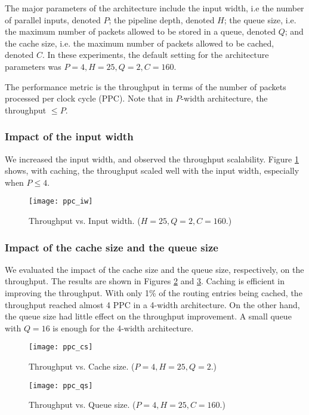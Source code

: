 \documentclass{sigcomm-alternate}
\begin{document}
The major parameters of the architecture include the input width, i.e the number of parallel inputs, denoted $P$; the pipeline depth, denoted $H$; the queue size, i.e. the maximum number of packets allowed to be stored in a queue, denoted $Q$; and the cache size, i.e. the maximum number of packets allowed to be cached, denoted $C$. In these experiments, the default setting for the architecture parameters was $P = 4, H = 25, Q = 2, C = 160$.

The performance metric is the throughput in terms of the number of packets processed per clock cycle (PPC). Note that in $P$-width architecture, the throughput $\leq P$.


\subsubsection{Impact of the input width}

We increased the input width, and observed the throughput scalability. Figure \ref{fig:ppc_iw} shows, with caching, the throughput scaled well with the input width, especially when $P \leq 4$.
\begin{figure}[htb]
\centering
\texttt{[image: ppc\_iw]}
\caption{Throughput vs. Input width. ($H = 25, Q = 2, C = 160$.)}
\label{fig:ppc_iw}
\end{figure}

\subsubsection{Impact of the cache size and the queue size}

We evaluated the impact of the cache size and the queue size, respectively, on the throughput. The results are shown in Figures \ref{fig:ppc_cs} and \ref{fig:ppc_qs}. Caching is efficient in improving the throughput. With only 1\% of the routing entries being cached, the throughput reached almost 4 PPC in a 4-width architecture. On the other hand, the queue size had little effect on the throughput improvement. A small queue with $Q = 16$ is enough for the 4-width architecture. 

\begin{figure}[htb]
\centering
\texttt{[image: ppc\_cs]}
\caption{Throughput vs. Cache size. ($P = 4, H = 25, Q = 2$.)}
\label{fig:ppc_cs}
\end{figure}

\begin{figure}[htb]
\centering
\texttt{[image: ppc\_qs]}
\caption{Throughput vs. Queue size. ($P = 4, H = 25, C = 160$.)}
\label{fig:ppc_qs}
\end{figure}
\end{document}

